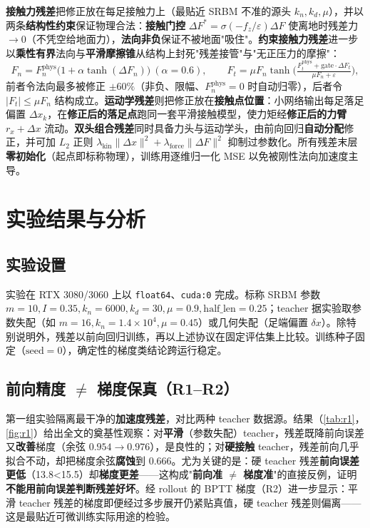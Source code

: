 \documentclass[zihao=5, a4paper]{ctexart}
\begin{document}
\textbf{接触力残差}把修正放在每足接触力上（最贴近 SRBM 不准的源头 $k_n,k_d,\mu$），并以两条\textbf{结构性约束}保证物理合法：\textbf{接触门控} $\Delta F^\ast=\sigma(-f_z/\varepsilon)\Delta F$ 使离地时残差力$\to$0（不凭空给地面力），\textbf{法向非负}保证不被地面"吸住"。\textbf{约束接触力残差}进一步以\textbf{乘性有界}法向与\textbf{平滑摩擦锥}从结构上封死"残差接管"与"无正压力的摩擦"：
\begin{equation}
  F_n=F_n^{\text{phys}}\big(1+\alpha\tanh(\Delta F_n)\big)\ (\alpha{=}0.6),
  \qquad
  F_t=\mu F_n\tanh\!\Big(\tfrac{F_t^{\text{phys}}+\text{gate}\cdot\Delta F_t}{\mu F_n+\varepsilon}\Big),
  \label{eq:constrained}
\end{equation}
前者令法向最多被修正 $\pm60\%$（非负、限幅、$F_n^{\text{phys}}{=}0$ 时自动归零），后者令 $|F_t|\le\mu F_n$ 结构成立。\textbf{运动学残差}则把修正放在\textbf{接触点位置}：小网络输出每足落足偏置 $\Delta x_k$，在\textbf{修正后的落足点}跑同一套平滑接触模型，使力矩经\textbf{修正后的力臂} $r_x{+}\Delta x$ 流动。\textbf{双头组合残差}同时具备力头与运动学头，由前向回归\textbf{自动分配}修正，并可加 $L_2$ 正则 $\lambda_{\text{kin}}\|\Delta x\|^2+\lambda_{\text{force}}\|\Delta F\|^2$ 抑制过参数化。所有残差末层\textbf{零初始化}（起点即标称物理），训练用逐维归一化 MSE 以免被刚性法向加速度主导。

\section{实验结果与分析}

\subsection{实验设置}

实验在 RTX 3080/3060 上以 \texttt{float64}、\texttt{cuda:0} 完成。标称 SRBM 参数 $m{=}10,I{=}0.35,k_n{=}6000,k_d{=}30,\mu{=}0.9,\text{half\_len}{=}0.25$；teacher 据实验取参数失配（如 $m{=}16,k_n{=}1.4\times10^4,\mu{=}0.45$）或几何失配（足端偏置 $\delta x$）。除特别说明外，残差以前向回归训练，再以上述协议在固定评估集上比较。训练种子固定（$\text{seed}{=}0$），确定性的梯度类结论跨运行稳定。

\subsection{前向精度 $\neq$ 梯度保真（R1--R2）}

第一组实验隔离最干净的\textbf{加速度残差}，对比两种 teacher 数据源。结果（\cref{tab:r1}，\cref{fig:r1}）给出全文的奠基性观察：对\textbf{平滑}（参数失配）teacher，残差既降前向误差又\textbf{改善}梯度（余弦 $0.954\!\to\!0.976$），是良性的；对\textbf{硬接触} teacher，残差前向几乎拟合不动，却把梯度余弦\textbf{腐蚀}到 $0.666$。尤为关键的是：硬 teacher 残差\textbf{前向误差更低}（13.8<15.5）却\textbf{梯度更差}——这构成"\textbf{前向准 $\neq$ 梯度准}"的直接反例，证明\textbf{不能用前向误差判断残差好坏}。经 rollout 的 BPTT 梯度（R2）进一步显示：平滑 teacher 残差的梯度即便经过多步展开仍紧贴真值，硬 teacher 残差则偏离——这是最贴近可微训练实际用途的检验。
\end{document}
